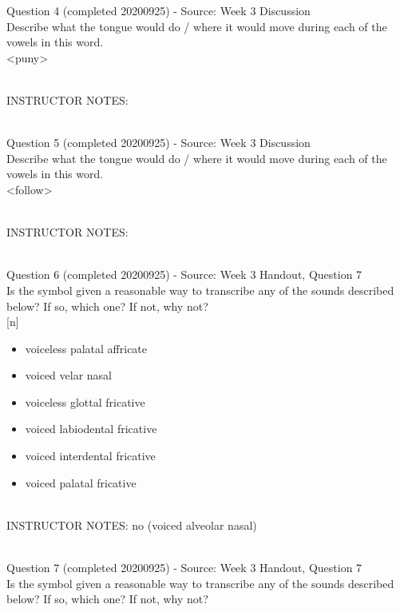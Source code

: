 \documentclass[12pt]{article}
\begin{document}
{\large Question 4} (completed 20200925) - Source: Week 3 Discussion\\

Describe what the tongue would do / where it would move during each of the vowels in this word.\\

<puny>


~\\
INSTRUCTOR NOTES: 


~\\

{\large Question 5} (completed 20200925) - Source: Week 3 Discussion\\

Describe what the tongue would do / where it would move during each of the vowels in this word.\\

<follow>


~\\
INSTRUCTOR NOTES: 


~\\

{\large Question 6} (completed 20200925) - Source: Week 3 Handout, Question 7\\

Is the symbol given a reasonable way to transcribe any of the sounds described below? If so, which one? If not, why not?\\

{[n]}

\begin{itemize} \item voiceless palatal affricate \item voiced velar nasal \item voiceless glottal fricative \item voiced labiodental fricative \item voiced interdental fricative \item voiced palatal fricative \end{itemize}


~\\
INSTRUCTOR NOTES: no (voiced alveolar nasal)


~\\

{\large Question 7} (completed 20200925) - Source: Week 3 Handout, Question 7\\

Is the symbol given a reasonable way to transcribe any of the sounds described below? If so, which one? If not, why not?\\
\end{document}
